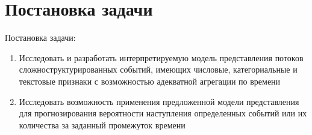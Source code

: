 \section{Постановка задачи}
\label{sec:task_statement} 

Постановка задачи:
\begin{enumerate}
    \item Исследовать и разработать интерпретируемую модель представления потоков сложноструктурированных событий, имеющих числовые, категориальные и текстовые признаки с возможностью адекватной агрегации по времени
    \item Исследовать возможность применения предложенной модели представления для прогнозирования вероятности наступления определенных событий или их количества за заданный промежуток времени
\end{enumerate}
